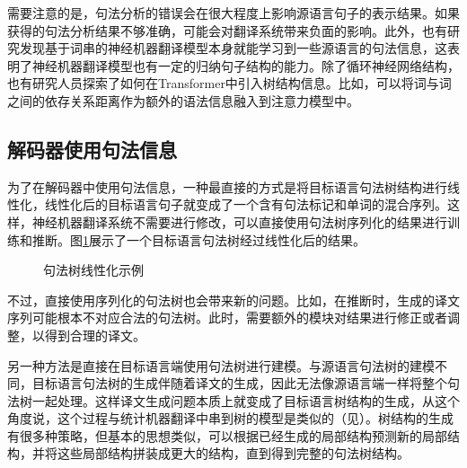 \parinterval 需要注意的是，句法分析的错误会在很大程度上影响源语言句子的表示结果。如果获得的句法分析结果不够准确，可能会对翻译系统带来负面的影响。此外，也有研究发现基于词串的神经机器翻译模型本身就能学习到一些源语言的句法信息，这表明了神经机器翻译模型也有一定的归纳句子结构的能力。除了循环神经网络结构，也有研究人员探索了如何在Transformer中引入树结构信息。比如，可以将词与词之间的依存关系距离作为额外的语法信息融入到注意力模型中。


\subsection{解码器使用句法信息}\label{subsec-15.3.2}

\parinterval 为了在解码器中使用句法信息，一种最直接的方式是将目标语言句法树结构进行线性化，线性化后的目标语言句子就变成了一个含有句法标记和单词的混合序列。这样，神经机器翻译系统不需要进行修改，可以直接使用句法树序列化的结果进行训练和推断。图\ref{fig:15-24}展示了一个目标语言句法树经过线性化后的结果。

\begin{figure}[htp]
\centering

\caption{句法树线性化示例}
\label{fig:15-24}
\end{figure}

\parinterval 不过，直接使用序列化的句法树也会带来新的问题。比如，在推断时，生成的译文序列可能根本不对应合法的句法树。此时，需要额外的模块对结果进行修正或者调整，以得到合理的译文。

\parinterval 另一种方法是直接在目标语言端使用句法树进行建模。与源语言句法树的建模不同，目标语言句法树的生成伴随着译文的生成，因此无法像源语言端一样将整个句法树一起处理。这样译文生成问题本质上就变成了目标语言树结构的生成，从这个角度说，这个过程与统计机器翻译中串到树的模型是类似的（见{\chaptereight}）。树结构的生成有很多种策略，但基本的思想类似，可以根据已经生成的局部结构预测新的局部结构，并将这些局部结构拼装成更大的结构，直到得到完整的句法树结构。

